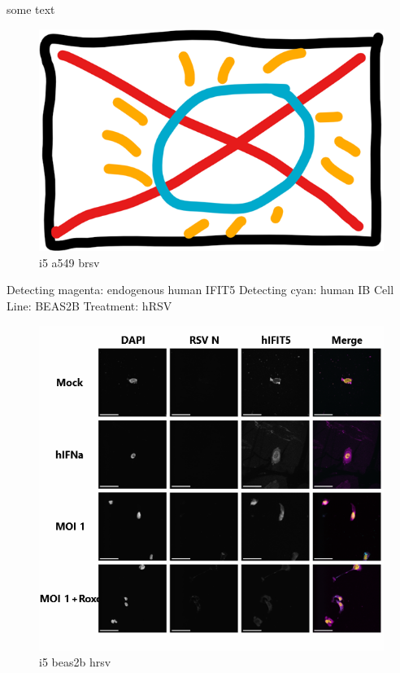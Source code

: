 some text

\begin{figure}
    \centering
    \includegraphics[width=0.5\linewidth]{06. Chapter 1//Figs/00. placeholder.png}
    \caption[i5 a549 brsv]{i5 a549 brsv}
    \label{i5 a549 brsv}
\end{figure}

Detecting magenta: endogenous human IFIT5 \newline
Detecting cyan: human IB \newline
Cell Line: BEAS2B \newline
Treatment: hRSV \newline

\begin{figure}
    \centering
    \includegraphics[width=1\linewidth]{08. Chapter 3/Figs/05. IFIT5/03. beas2b hrsv.png}
    \caption[i5 beas2b hrsv]{i5 beas2b hrsv}
    \label{i5 beas2b hrsv}
\end{figure}

